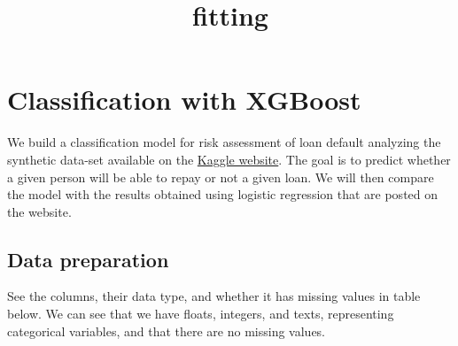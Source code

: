 \documentclass[11pt]{article}
\title{fitting}
\begin{document}
    
    \maketitle
    
    

    
    \section{Classification with XGBoost}\label{classification-with-xgboost}

We build a classification model for risk assessment of loan default
analyzing the synthetic data-set available on the
\href{https://www.kaggle.com/datasets/udaymalviya/bank-loan-data}{Kaggle
website}. The goal is to predict whether a given person will be able to
repay or not a given loan. We will then compare the model with the
results obtained using logistic regression that are posted on the
website.

    \subsection{Data preparation}\label{data-preparation}

See the columns, their data type, and whether it has missing values in
table below. We can see that we have floats, integers, and texts,
representing categorical variables, and that there are no missing
values.
\end{document}
